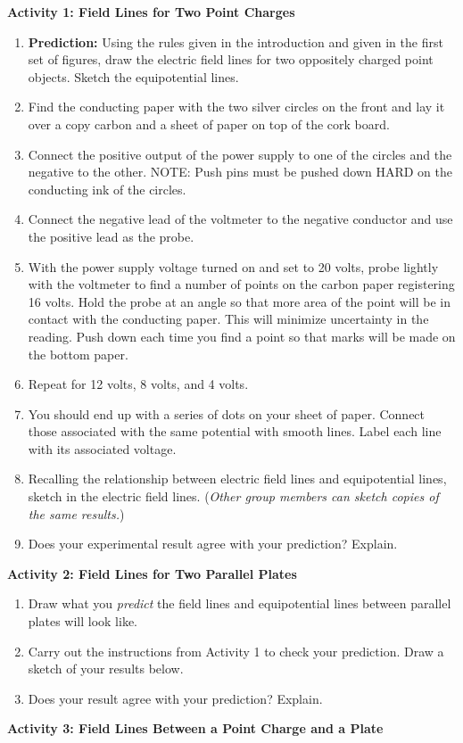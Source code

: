 \textbf{Activity 1: Field Lines for Two Point Charges}

\begin{enumerate}[labparts]
\item\textbf{Prediction:} Using the rules given in the introduction and
given in the first set of figures, draw the electric field lines for two
oppositely charged point objects. Sketch the equipotential lines.
\answerspace{1in}

\item Find the conducting paper with the two silver circles on the front
and lay it over a copy carbon and a sheet of paper on top of the cork
board.
\item Connect the positive output of the power supply to one of the circles
and the negative to the other. NOTE: Push pins must be pushed down HARD on the 
conducting ink of the circles.
\item Connect the negative lead of the voltmeter to the negative conductor
and use the positive lead as the probe. 
\item With the power supply voltage turned on and set to 20 volts, probe
lightly with the voltmeter to find a number of points on the carbon
paper registering 16 volts. Hold the probe at an angle so that more area of the 
point will be in contact with the conducting paper. This will minimize 
uncertainty in the reading. Push down each time you find a point so
that marks will be made on the bottom paper.
\item Repeat for 12 volts, 8 volts, and 4 volts.
\item You should end up with a series of dots on your sheet of paper. Connect
those associated with the same potential with smooth lines. Label each line 
with its associated voltage.
\item Recalling the relationship between electric field lines and equipotential
lines, sketch in the electric field lines. (\emph{Other group members
can sketch copies of the same results.})
\item Does your experimental result agree with your prediction? Explain.
\answerspace{15mm}

\end{enumerate}

\pagebreak[2]
\textbf{Activity 2: Field Lines for Two Parallel Plates}

\begin{enumerate}[labparts]
\item Draw what you \textit{predict} the field lines and equipotential
lines between parallel plates will look like.
\answerspace{1.2in}

\item Carry out the instructions from Activity 1 to check your prediction.  Draw a sketch of your results below.
\answerspace{1.2in}

\item Does your result agree with your prediction? Explain.
\answerspace{.5in}

\end{enumerate}
\textbf{Activity 3: Field Lines Between a Point Charge and a Plate}

